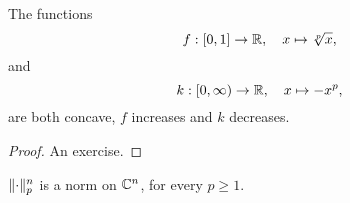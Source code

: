 \begin{lemma}\label{lemma:two-concave-functions}
  The functions
  \begin{equation}\label{eq:f-function}
    f:[0,1]\to\mathbb{R},\quad{x\mapsto{\sqrt[p]{x}}},
  \end{equation}
  and
  \begin{equation}\label{eq:k-function}
    k:[0,\infty)\to\mathbb{R},\quad{x\mapsto{-x^{p}}},
  \end{equation}
  are both concave, \(f\) increases and \(k\) decreases.
\end{lemma}

\begin{proof}
  An exercise.
\end{proof}

\begin{proposition}\label{proposition:the-p-norm-is-in-fact-a-norm}
  \(\norm<n>(p)\) is a norm on \(\mathbb{C}^{n}\), for every
  \(p\geqslant{1}\).
\end{proposition}

